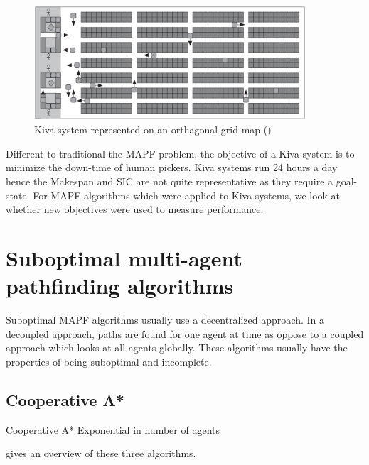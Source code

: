 \documentclass[a4paper,11pt]{article}
\begin{document}
\begin{figure}[h]
	\centering
	\includegraphics[width=0.9\textwidth]{graphics/kivasystemlayout}
	\caption{Kiva system represented on an orthagonal grid map (\cite{wurman2008coordinating})}
	\label{fig:kivawarehouse}
\end{figure}

Different to traditional the MAPF problem, the objective of a Kiva system is to minimize the down-time of human pickers. Kiva systems run 24 hours a day hence the Makespan and SIC are not quite representative as they require a goal-state. For MAPF algorithms which were applied to Kiva systems, we look at whether new objectives were used to measure performance.

\section{Suboptimal multi-agent pathfinding algorithms} \label{sec:suboptimal}
Suboptimal MAPF algorithms usually use a decentralized approach. In a decoupled approach, paths are found for one agent at time as oppose to a coupled approach which looks at all agents globally. These algorithms usually have the properties of being suboptimal and incomplete.


\subsection{Cooperative A*}
Cooperative A*
Exponential in number of agents

\cite{holte1995hierarchical}

\cite{silver2005cooperative} gives an overview of these three algorithms.
\end{document}
